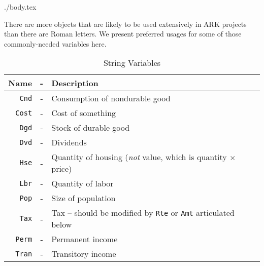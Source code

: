 \documentclass{econtex}
\begin{document}
\begin{verbatimwrite}{./body.tex}

There are more objects that are likely to be used extensively in ARK projects than there are Roman letters.  We present preferred usages for some of those commonly-needed variables here.

\begin{table}[h]
\begin{center}
\begin{tabular}{||rcl||}
\hline
Name & - & Description 
 \\ \hline \texttt{Cnd}    & - & Consumption of nondurable good 
 \\  \texttt{Cost}    & - & Cost of something 
 \\  \texttt{Dgd}    & - & Stock of durable good
 \\  \texttt{Dvd}    & - & Dividends 
 \\  \texttt{Hse}    & - & Quantity of housing ({\it not} value, which is quantity $\times$ price)
 \\  \texttt{Lbr}    & - & Quantity of labor
 \\  \texttt{Pop}    & - & Size of population
 \\  \texttt{Tax} & - & Tax -- should be modified by \texttt{Rte} or \texttt{Amt} articulated below
 \\  \texttt{Perm}   & - & Permanent income
 \\  \texttt{Tran}   & - & Transitory income
\\ \hline
\end{tabular}
\caption{String Variables}
\label{table:Strings}
\end{center}
\end{table}

\end{verbatimwrite}

\end{document}
